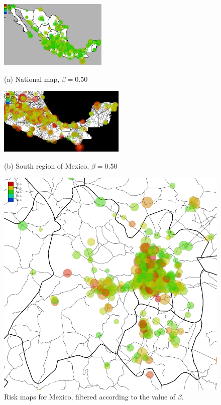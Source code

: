 \begin{figure}[ht!]
	\caption{Risk maps for Mexico, filtered according to the value of $\beta$.}
	\label{fig:mapas_mexico}
	\begin{minipage}{.475\linewidth}
		\centering
		\includegraphics[width=0.95\columnwidth,height=3.2cm,keepaspectratio]
		{figures/mexico_usuarios_volumen_circulos_allday_beta--50_min_volume--80_mexico_/mexico_usuarios_volumen_circulos_allday_beta--50_min_volume--80_mexico_}

		(a) National map, $\beta = 0.50$
	\end{minipage}
	\begin{minipage}{.520\linewidth}
		\centering
		\includegraphics[width=0.95\columnwidth,height=3.2cm,keepaspectratio]
		{figures/sur_usuarios_volumen_circulos_allday_beta--50_min_volume--80_mexico_/sur_usuarios_volumen_circulos_allday_beta--50_min_volume--80_mexico_}

		(b) South region of Mexico, $\beta = 0.50$
	\end{minipage}

	\begin{minipage}{.32\linewidth}
		\centering
		\includegraphics[width=0.90\columnwidth]
		{figures/estado_mexico_usuarios_volumen_circulos_allday_beta--50_min_volume--80_mexico_/estado_mexico_usuarios_volumen_circulos_allday_beta--50_min_volume--80_mexico_}


\end{minipage}
\end{figure}
